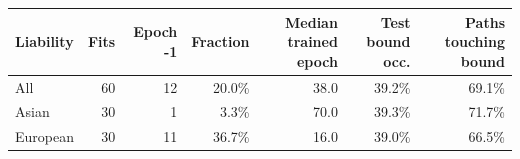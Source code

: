 \begin{tabular}{lrrrrrr}
\toprule
Liability & Fits & Epoch -1 & Fraction & Median trained epoch & Test bound occ. & Paths touching bound \\
\midrule
All & 60 & 12 & 20.0\% & 38.0 & 39.2\% & 69.1\% \\
Asian & 30 & 1 & 3.3\% & 70.0 & 39.3\% & 71.7\% \\
European & 30 & 11 & 36.7\% & 16.0 & 39.0\% & 66.5\% \\
\bottomrule
\end{tabular}
